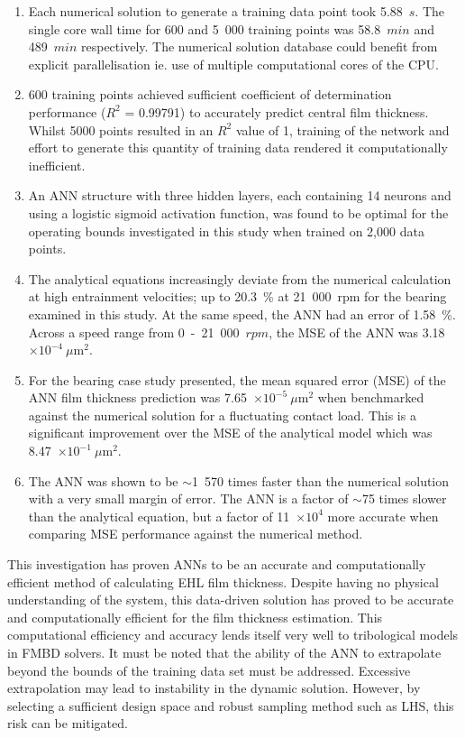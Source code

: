 \begin{enumerate}
	\item Each numerical solution to generate a training data point took 5.88~$s$. The single core wall time for 600 and 5~000 training points was 58.8~$min$ and 489~$min$ respectively. The numerical solution database could benefit from explicit parallelisation ie. use of multiple computational cores of the CPU. 
	\item 600 training points achieved sufficient coefficient of determination performance ($R^2$ = 0.99791) to accurately predict central film thickness. Whilst 5000 points resulted in an $R^2$ value of 1, training of the network and effort to generate this quantity of training data rendered it computationally inefficient.
	\item An ANN structure with three hidden layers, each containing 14 neurons and using a logistic sigmoid activation function, was found to be optimal for the operating bounds investigated in this study when trained on 2,000 data points.
	\item The analytical equations increasingly deviate from the numerical calculation at high entrainment velocities; up to 20.3~\% at 21~000~rpm for the bearing examined in this study. At the same speed, the ANN had an error of 1.58~\%. Across a speed range from 0~-~21~000~$rpm$, the MSE of the ANN was 3.18~$\times 10^{-4}~\mu \mathrm{m}^2$.
	\item For the bearing case study presented, the mean squared error (MSE) of the ANN film thickness prediction was 7.65~$\times 10^{-5}~\mu \mathrm{m}^2$ when benchmarked against the numerical solution for a fluctuating contact load. This is a significant improvement over the MSE of the analytical model which was 8.47~$\times 10^{-1}~\mu\mathrm{m}^2$.
	\item The ANN was shown to be $\sim$1~570 times faster than the numerical solution with a very small margin of error. The ANN is a factor of $\sim$75 times slower than the analytical equation, but a factor of 11~$\times 10^{4}$ more accurate when comparing MSE performance against the numerical method.
\end{enumerate}

This investigation has proven ANNs to be an accurate and computationally efficient method of calculating EHL film thickness. Despite having no physical understanding of the system, this data-driven solution has proved to be accurate and computationally efficient for the film thickness estimation. This computational efficiency and accuracy lends itself very well to tribological models in FMBD solvers. It must be noted that the ability of the ANN to extrapolate beyond the bounds of the training data set must be addressed. Excessive extrapolation may lead to instability in the dynamic solution. However, by selecting a sufficient design space and robust sampling method such as LHS, this risk can be mitigated.

